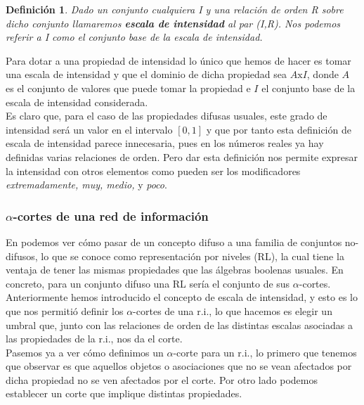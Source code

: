 \documentclass[10pt,a4paper]{article}
\newtheorem{definicion}{Definición}
\begin{document}
\begin{definicion}
\label{defiescala}
Dado un conjunto cualquiera I y una relación de orden R sobre dicho conjunto llamaremos \textit{\textbf{escala de intensidad}} al par (I,R). Nos podemos referir a I como el conjunto base de la escala de intensidad.
\end{definicion}

Para dotar a una propiedad de intensidad lo único que hemos de hacer es tomar una escala de intensidad y que el dominio de dicha propiedad sea $A\mathrm{x}I$, donde $A$ es el conjunto de valores que puede tomar la propiedad e $I$ el conjunto base de la escala de intensidad considerada.\\

Es claro que, para el caso de las propiedades difusas usuales, este grado de intensidad será un valor en el intervalo $[0,1]$ y que por tanto esta definición de escala de intensidad parece innecesaria, pues en los números reales ya hay definidas varias relaciones de orden. Pero dar esta definición nos permite expresar la intensidad con otros elementos como pueden ser los modificadores \textit{extremadamente, muy, medio,} y  \textit{poco}.\\

\subsubsection{$\alpha$-cortes de una red de información}

En \cite{artDanielRL} podemos ver cómo pasar de un concepto difuso a una familia de conjuntos no-difusos, lo que se conoce como representación por niveles (RL), la cual tiene la ventaja de tener las mismas propiedades que las álgebras boolenas usuales. En concreto, para un conjunto difuso una RL sería el conjunto de sus $\alpha$-cortes.\\

Anteriormente hemos introducido el concepto de escala de intensidad, y esto es lo que nos permitió definir los $\alpha$-cortes de una r.i., lo que hacemos es elegir un umbral que, junto con las relaciones de orden de las distintas escalas asociadas a las propiedades de la r.i., nos da el corte.\\

Pasemos ya a ver cómo definimos un $\alpha$-corte para un r.i., lo primero que tenemos que observar es que aquellos objetos o asociaciones que no se vean afectados por dicha propiedad no se ven afectados por el corte. Por otro lado podemos establecer un corte que implique distintas propiedades.
\end{document}
